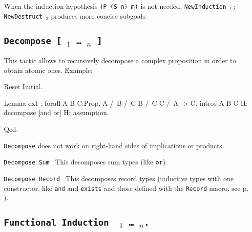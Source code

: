 \Rem When the induction hypothesis \verb+(P (S n) m)+ is not
needed, {\tt NewInduction \ident$_1$; NewDestruct \ident$_2$} produces
more concise subgoals.


\subsection{\tt Decompose [ {\ident$_1$} \dots\ {\ident$_n$} ] \term}
\label{Decompose}
This tactic allows to recursively decompose a
complex proposition in order to obtain atomic ones.
Example: 

\begin{coq_eval}
Reset Initial.
\end{coq_eval}
\begin{coq_example}
Lemma ex1 : forall A B C:Prop, A /\ B /\ C \/ B /\ C \/ C /\ A -> C.
intros A B C H; decompose [and or] H; assumption.
\end{coq_example}
\begin{coq_example*}
Qed.
\end{coq_example*}

{\tt Decompose} does not work on right-hand sides of implications or products.

\begin{Variants}
  
\item {\tt Decompose Sum \term}
  This decomposes sum types (like \texttt{or}).
\item {\tt Decompose Record \term}
  This decomposes record types (inductive types with one constructor,
  like \texttt{and} and \texttt{exists} and those defined with the
  \texttt{Record} macro, see p. \pageref{Record}).
\end{Variants}


\subsection{\tt Functional Induction \ident\ \term$_1$ \dots\ \term$_n$.}
\label{FunInduction}

